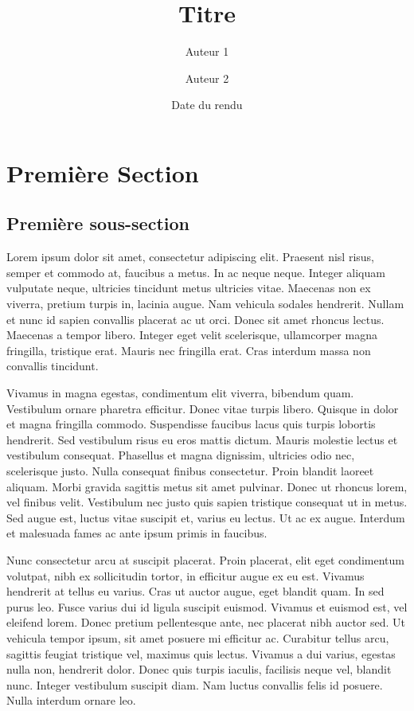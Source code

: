 \documentclass[11pt,a4paper]{article}
\author{Auteur 1 \and Auteur 2}
\title{Titre}
\date{Date du rendu}
\begin{document}
\maketitle
\tableofcontents
\section{Première Section}
\subsection{Première sous-section}
Lorem ipsum dolor sit amet, consectetur adipiscing elit. Praesent nisl risus, semper et commodo at, faucibus a metus. In ac neque neque. Integer aliquam vulputate neque, ultricies tincidunt metus ultricies vitae. Maecenas non ex viverra, pretium turpis in, lacinia augue. Nam vehicula sodales hendrerit. Nullam et nunc id sapien convallis placerat ac ut orci. Donec sit amet rhoncus lectus. Maecenas a tempor libero. Integer eget velit scelerisque, ullamcorper magna fringilla, tristique erat. Mauris nec fringilla erat. Cras interdum massa non convallis tincidunt.
\newline

Vivamus in magna egestas, condimentum elit viverra, bibendum quam. Vestibulum ornare pharetra efficitur. Donec vitae turpis libero. Quisque in dolor et magna fringilla commodo. Suspendisse faucibus lacus quis turpis lobortis hendrerit. Sed vestibulum risus eu eros mattis dictum. Mauris molestie lectus et vestibulum consequat. Phasellus et magna dignissim, ultricies odio nec, scelerisque justo. Nulla consequat finibus consectetur. Proin blandit laoreet aliquam. Morbi gravida sagittis metus sit amet pulvinar. Donec ut rhoncus lorem, vel finibus velit. Vestibulum nec justo quis sapien tristique consequat ut in metus. Sed augue est, luctus vitae suscipit et, varius eu lectus. Ut ac ex augue. Interdum et malesuada fames ac ante ipsum primis in faucibus.
\newline

Nunc consectetur arcu at suscipit placerat. Proin placerat, elit eget condimentum volutpat, nibh ex sollicitudin tortor, in efficitur augue ex eu est. Vivamus hendrerit at tellus eu varius. Cras ut auctor augue, eget blandit quam. In sed purus leo. Fusce varius dui id ligula suscipit euismod. Vivamus et euismod est, vel eleifend lorem. Donec pretium pellentesque ante, nec placerat nibh auctor sed. Ut vehicula tempor ipsum, sit amet posuere mi efficitur ac. Curabitur tellus arcu, sagittis feugiat tristique vel, maximus quis lectus. Vivamus a dui varius, egestas nulla non, hendrerit dolor. Donec quis turpis iaculis, facilisis neque vel, blandit nunc. Integer vestibulum suscipit diam. Nam luctus convallis felis id posuere. Nulla interdum ornare leo.
\newline
\end{document}
